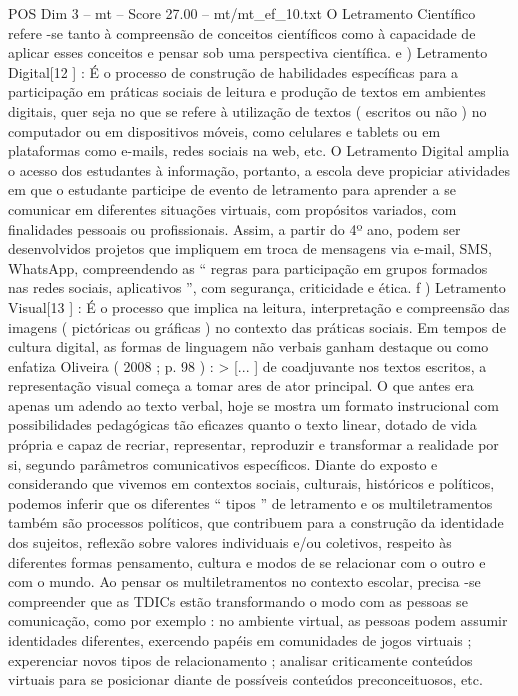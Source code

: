 \begin{textsample}{POS Dim 3 – mt – Score 27.00 – mt/mt\_ef\_10.txt}
O Letramento Científico refere -se tanto à compreensão de conceitos científicos como à capacidade de aplicar esses conceitos e pensar sob uma perspectiva científica. e ) Letramento Digital[12 ] : É o processo de construção de habilidades específicas para a participação em práticas sociais de leitura e produção de textos em ambientes digitais, quer seja no que se refere à utilização de textos ( escritos ou não ) no computador ou em dispositivos móveis, como celulares e tablets ou em plataformas como e-mails, redes sociais na web, etc.
O Letramento Digital amplia o acesso dos estudantes à informação, portanto, a escola deve propiciar atividades em que o estudante participe de evento de letramento para aprender a se comunicar em diferentes situações virtuais, com propósitos variados, com finalidades pessoais ou profissionais.
Assim, a partir do 4º ano, podem ser desenvolvidos projetos que impliquem em troca de mensagens via e-mail, SMS, WhatsApp, compreendendo as “ regras para participação em grupos formados nas redes sociais, aplicativos ”, com segurança, criticidade e ética. f ) Letramento Visual[13 ] : É o processo que implica na leitura, interpretação e compreensão das imagens ( pictóricas ou gráficas ) no contexto das práticas sociais.
Em tempos de cultura digital, as formas de linguagem não verbais ganham destaque ou como enfatiza Oliveira ( 2008 ; p. 98 ) : > [... ] de coadjuvante nos textos escritos, a representação visual começa a tomar ares de ator principal.
O que antes era apenas um adendo ao texto verbal, hoje se mostra um formato instrucional com possibilidades pedagógicas tão eficazes quanto o texto linear, dotado de vida própria e capaz de recriar, representar, reproduzir e transformar a realidade por si, segundo parâmetros comunicativos específicos.
Diante do exposto e considerando que vivemos em contextos sociais, culturais, históricos e políticos, podemos inferir que os diferentes “ tipos ” de letramento e os multiletramentos também são processos políticos, que contribuem para a construção da identidade dos sujeitos, reflexão sobre valores individuais e/ou coletivos, respeito às diferentes formas pensamento, cultura e modos de se relacionar com o outro e com o mundo.
Ao pensar os multiletramentos no contexto escolar, precisa -se compreender que as TDICs estão transformando o modo com as pessoas se comunicação, como por exemplo : no ambiente virtual, as pessoas podem assumir identidades diferentes, exercendo papéis em comunidades de jogos virtuais ; experenciar novos tipos de relacionamento ; analisar criticamente conteúdos virtuais para se posicionar diante de possíveis conteúdos preconceituosos, etc.

\end{textsample}
